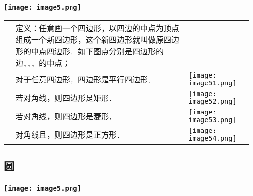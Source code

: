 \hypertarget{ux5b66ux79d1ux7f51www.zxxk.com--ux6559ux80b2ux8d44ux6e90ux95e8ux6237ux63d0ux4f9bux8bd5ux9898ux8bd5ux5377ux6559ux6848ux8bfeux4ef6ux6559ux5b66ux8bbaux6587ux7d20ux6750ux7b49ux5404ux7c7bux6559ux5b66ux8d44ux6e90ux5e93ux4e0bux8f7dux8fd8ux6709ux5927ux91cfux4e30ux5bccux7684ux6559ux5b66ux8d44ux8baf-16}{%
\subsubsection{\texorpdfstring{\protect\texttt{[image: image5.png]}}{学科网(www.zxxk.com)-\/-教育资源门户，提供试题试卷、教案、课件、教学论文、素材等各类教学资源库下载，还有大量丰富的教学资讯！}}\label{ux5b66ux79d1ux7f51www.zxxk.com--ux6559ux80b2ux8d44ux6e90ux95e8ux6237ux63d0ux4f9bux8bd5ux9898ux8bd5ux5377ux6559ux6848ux8bfeux4ef6ux6559ux5b66ux8bbaux6587ux7d20ux6750ux7b49ux5404ux7c7bux6559ux5b66ux8d44ux6e90ux5e93ux4e0bux8f7dux8fd8ux6709ux5927ux91cfux4e30ux5bccux7684ux6559ux5b66ux8d44ux8baf-16}}

\begin{longtable}[]{@{}lll@{}}
\toprule
\endhead
&
定义：任意画一个四边形，以四边的中点为顶点组成一个新四边形，这个新四边形就叫做原四边形的中点四边形．如下图点分别是四边形的边、、、的中点；
&\tabularnewline
& 对于任意四边形，四边形是平行四边形． &
\texttt{[image: image51.png]}\tabularnewline
& 若对角线，则四边形是矩形． &
\texttt{[image: image52.png]}\tabularnewline
& 若对角线，则四边形是菱形． &
\texttt{[image: image53.png]}\tabularnewline
& 对角线且，则四边形是正方形． &
\texttt{[image: image54.png]}\tabularnewline
\bottomrule
\end{longtable}

\hypertarget{ux5706}{%
\subsection{\texorpdfstring{ 圆}{ 圆}}\label{ux5706}}

\hypertarget{ux5b66ux79d1ux7f51www.zxxk.com--ux6559ux80b2ux8d44ux6e90ux95e8ux6237ux63d0ux4f9bux8bd5ux9898ux8bd5ux5377ux6559ux6848ux8bfeux4ef6ux6559ux5b66ux8bbaux6587ux7d20ux6750ux7b49ux5404ux7c7bux6559ux5b66ux8d44ux6e90ux5e93ux4e0bux8f7dux8fd8ux6709ux5927ux91cfux4e30ux5bccux7684ux6559ux5b66ux8d44ux8baf-17}{%
\subsubsection{\texorpdfstring{\protect\texttt{[image: image5.png]}}{学科网(www.zxxk.com)-\/-教育资源门户，提供试题试卷、教案、课件、教学论文、素材等各类教学资源库下载，还有大量丰富的教学资讯！}}\label{ux5b66ux79d1ux7f51www.zxxk.com--ux6559ux80b2ux8d44ux6e90ux95e8ux6237ux63d0ux4f9bux8bd5ux9898ux8bd5ux5377ux6559ux6848ux8bfeux4ef6ux6559ux5b66ux8bbaux6587ux7d20ux6750ux7b49ux5404ux7c7bux6559ux5b66ux8d44ux6e90ux5e93ux4e0bux8f7dux8fd8ux6709ux5927ux91cfux4e30ux5bccux7684ux6559ux5b66ux8d44ux8baf-17}}

